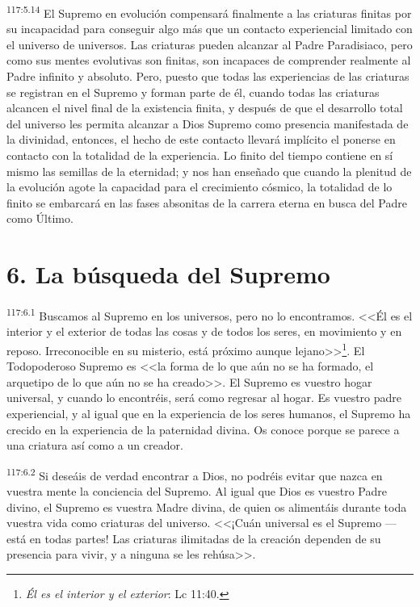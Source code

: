 \documentclass[twoside, 11pt]{book}
\begin{document}
\par
\textsuperscript{117:5.14} El Supremo en evolución compensará finalmente a las criaturas finitas por su incapacidad para conseguir algo más que un contacto experiencial limitado con el universo de universos. Las criaturas pueden alcanzar al Padre Paradisiaco, pero como sus mentes evolutivas son finitas, son incapaces de comprender realmente al Padre infinito y absoluto. Pero, puesto que todas las experiencias de las criaturas se registran en el Supremo y forman parte de él, cuando todas las criaturas alcancen el nivel final de la existencia finita, y después de que el desarrollo total del universo les permita alcanzar a Dios Supremo como presencia manifestada de la divinidad, entonces, el hecho de este contacto llevará implícito el ponerse en contacto con la totalidad de la experiencia. Lo finito del tiempo contiene en sí mismo las semillas de la eternidad; y nos han enseñado que cuando la plenitud de la evolución agote la capacidad para el crecimiento cósmico, la totalidad de lo finito se embarcará en las fases absonitas de la carrera eterna en busca del Padre como Último.

\section*{6. La búsqueda del Supremo}
\par
\textsuperscript{117:6.1} Buscamos al Supremo en los universos, pero no lo encontramos. <<Él es el interior y el exterior de todas las cosas y de todos los seres, en movimiento y en reposo. Irreconocible en su misterio, está próximo aunque lejano>>\footnote{\textit{Él es el interior y el exterior}: Lc 11:40.}. El Todopoderoso Supremo es <<la forma de lo que aún no se ha formado, el arquetipo de lo que aún no se ha creado>>. El Supremo es vuestro hogar universal, y cuando lo encontréis, será como regresar al hogar. Es vuestro padre experiencial, y al igual que en la experiencia de los seres humanos, el Supremo ha crecido en la experiencia de la paternidad divina. Os conoce porque se parece a una criatura así como a un creador.

\par
\textsuperscript{117:6.2} Si deseáis de verdad encontrar a Dios, no podréis evitar que nazca en vuestra mente la conciencia del Supremo. Al igual que Dios es vuestro Padre divino, el Supremo es vuestra Madre divina, de quien os alimentáis durante toda vuestra vida como criaturas del universo. <<¡Cuán universal es el Supremo ---está en todas partes! Las criaturas ilimitadas de la creación dependen de su presencia para vivir, y a ninguna se les rehúsa>>.
\end{document}

